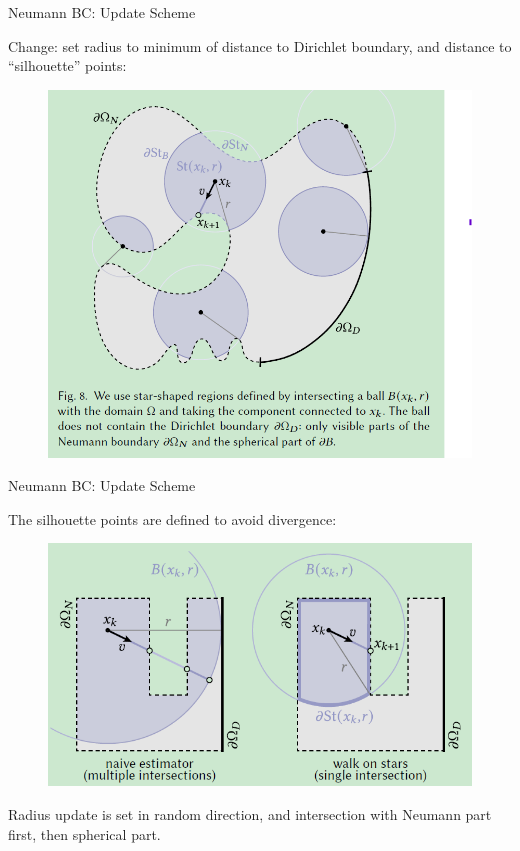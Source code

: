 \documentclass{beamer}
\begin{document}
\begin{frame}{Neumann BC: Update Scheme}

	Change: set radius to minimum of distance to Dirichlet boundary, and distance to ``silhouette'' points: 

	\begin{figure}[htbp]
		\centering
		\includegraphics[scale=0.4]{img/NBC-2.png}
	\end{figure}

\end{frame}

\begin{frame}{Neumann BC: Update Scheme}

	The silhouette points are defined to avoid divergence:
	\begin{figure}[htbp]
		\centering
		\includegraphics[scale=0.4]{img/NBC-3.png}
	\end{figure}
	Radius update is set in random direction, and intersection with Neumann part first, then spherical part.

\end{frame}
\end{document}
